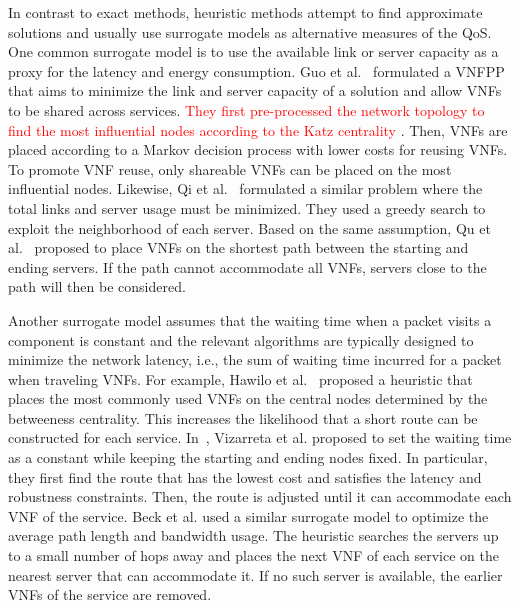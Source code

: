 In contrast to exact methods, heuristic methods attempt to find approximate solutions and usually use surrogate models as alternative measures of the QoS. One common surrogate model is to use the available link or server capacity as a proxy for the latency and energy consumption. Guo et al.~\cite{GuoWLQA0Y20} formulated a VNFPP that aims to minimize the link and server capacity of a solution and allow VNFs to be shared across services. \textcolor{red}{They first pre-processed the network topology to find the most influential nodes according to the Katz centrality \cite{Katz53}}. Then, VNFs are placed according to a Markov decision process with lower costs for reusing VNFs. To promote VNF reuse, only shareable VNFs can be placed on the most influential nodes. Likewise, Qi et al.~\cite{QiSW19} formulated a similar problem where the total links and server usage must be minimized. They used a greedy search to exploit the neighborhood of each server. Based on the same assumption, Qu et al.~\cite{QuASK17} proposed to place VNFs on the shortest path between the starting and ending servers. If the path cannot accommodate all VNFs, servers close to the path will then be considered.

Another surrogate model assumes that the waiting time when a packet visits a component is constant and the relevant algorithms are typically designed to minimize the network latency, i.e., the sum of waiting time incurred for a packet when traveling VNFs. For example, Hawilo et al.~\cite{HawiloJS19} proposed a heuristic that places the most commonly used VNFs on the central nodes determined by the betweeness centrality. This increases the likelihood that a short route can be constructed for each service. In~\cite{VizarretaCMMK17}, Vizarreta et al. proposed to set the waiting time as a constant while keeping the starting and ending nodes fixed. In particular, they first find the route that has the lowest cost and satisfies the latency and robustness constraints. Then, the route is adjusted until it can accommodate each VNF of the service. Beck et al. \cite{BeckB15} used a similar surrogate model to optimize the average path length and bandwidth usage. The heuristic searches the servers up to a small number of hops away and places the next VNF of each service on the nearest server that can accommodate it. If no such server is available, the earlier VNFs of the service are removed.

